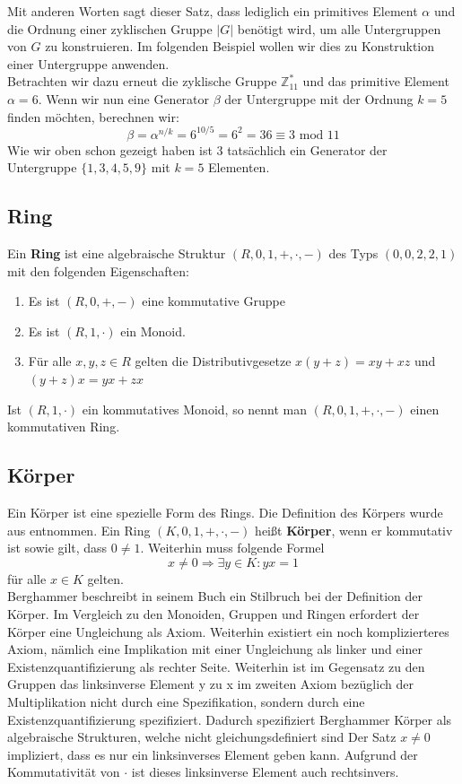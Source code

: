 Mit anderen Worten sagt dieser Satz, dass lediglich ein primitives Element $\alpha$ und die Ordnung einer zyklischen Gruppe $|G|$ benötigt wird, um alle Untergruppen von $G$ zu konstruieren. Im folgenden Beispiel wollen wir dies zu Konstruktion einer Untergruppe anwenden.\\

Betrachten wir dazu erneut die zyklische Gruppe $\mathbb{Z}^*_{11}$ und das primitive Element $\alpha = 6$. Wenn wir nun eine Generator $\beta$ der Untergruppe mit der Ordnung $k = 5$ finden möchten, berechnen wir:
$$\beta = \alpha^{n/k} = 6^{10/5} = 6^2 = 36 \equiv 3 \text{ mod } 11$$
Wie wir oben schon gezeigt haben ist $3$ tatsächlich ein Generator der Untergruppe $\{1,3,4,5,9\}$ mit $k = 5$ Elementen\cite[S. 246]{Paar.2016}.

\subsection{Ring}
Ein \textbf{Ring} ist eine algebraische Struktur $(R,0,1,+,\cdot,-)$ des Typs $(0,0,2,2,1)$ mit den folgenden Eigenschaften:
\begin{enumerate}
\item Es ist $(R,0,+,-)$ eine kommutative Gruppe
\item Es ist $(R,1,\cdot)$ ein Monoid.
\item Für alle $x,y,z \in R$ gelten die Distributivgesetze $x(y+z) = xy + xz$ und $(y+z)x = yx +zx$
\end{enumerate}
Ist $(R,1,\cdot)$ ein kommutatives Monoid, so nennt man $(R,0,1,+,\cdot,-)$ einen kommutativen Ring.

\subsection{Körper} \label{sec:koerper}
Ein Körper ist eine spezielle Form des Rings. Die Definition des Körpers wurde aus \cite[S. 364-365]{Berghammer.2021} entnommen. Ein Ring $(K,0,1,+,\cdot,-)$ heißt \textbf{Körper}, wenn er kommutativ ist sowie gilt, dass $0 \neq 1$. Weiterhin muss folgende Formel $$x \neq 0 \Rightarrow \exists y \in K : yx = 1$$ für alle $x \in K$ gelten.\\

Berghammer beschreibt in seinem Buch ein Stilbruch bei der Definition der Körper. Im Vergleich zu den Monoiden, Gruppen und Ringen erfordert der Körper eine Ungleichung als Axiom. Weiterhin existiert ein noch komplizierteres Axiom, nämlich eine Implikation mit einer Ungleichung als linker und einer Existenzquantifizierung als rechter Seite. Weiterhin ist im Gegensatz zu den Gruppen das linksinverse Element y zu x im zweiten Axiom bezüglich der Multiplikation nicht durch eine Spezifikation, sondern durch eine Existenzquantifizierung spezifiziert. Dadurch spezifiziert Berghammer Körper als algebraische Strukturen, welche nicht gleichungsdefiniert sind \cite[S. 364-365]{Berghammer.2021} Der Satz $x \neq 0$ impliziert, dass es nur ein linksinverses Element geben kann. Aufgrund der Kommutativität von \glqq$\cdot$\grqq{} ist dieses linksinverse Element auch rechtsinvers.\\


